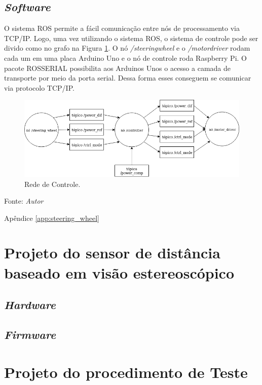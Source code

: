 \subsection{\textit{Software}}

O sistema ROS permite a fácil comunicação entre nós de processamento via TCP/IP.
Logo, uma vez utilizando o sistema ROS, o sistema de controle pode ser divido como no grafo na Figura \ref{fig:rosnet_controle}. 
O nó \textit{/steering\underline{\hspace{.0625in}}wheel} e o \textit{/motor\underline{\hspace{.0625in}}driver} rodam cada um em uma placa Arduino Uno e o nó de controle roda Raspberry Pi. O pacote ROSSERIAL possibilita aos Arduinos Unos o acesso a camada de transporte por meio da porta serial. Dessa forma esses conseguem se comunicar via protocolo TCP/IP.

\begin{figure}[!htb]
  \centering
  \caption{Rede de Controle.}
  \label{fig:rosnet_controle}
  \includegraphics[width=1\textwidth]{./img/projeto/rosnet_controle.png}
\end{figure}
Fonte: \textit{Autor}

Apêndice \ref{app:steering_wheel}

\pagebreak

\section{Projeto do sensor de distância baseado em visão estereoscópico}
    \subsection{\textit{Hardware}}
    \pagebreak
    \subsection{\textit{Firmware}}    
    \pagebreak
    
\section{Projeto do procedimento de Teste}
